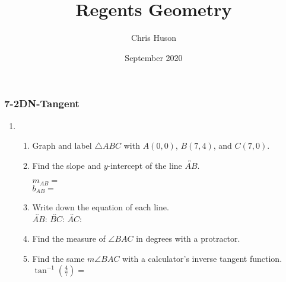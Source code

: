 \documentclass[12pt, twoside]{article}
\title{Regents Geometry}
\author{Chris Huson}
\date{September 2020}
\begin{document}
\subsubsection*{7-2DN-Tangent}
\begin{enumerate}
\item \begin{enumerate}
    \item Graph and label $\triangle ABC$ with $A(0,0)$, $B(7,4)$, and $C(7,0)$.
    \begin{center}
    \end{center}
    \item Find the slope and $y$-intercept of the line $\overleftrightarrow{AB}$.
      \begin{multicols}{2}
        $m_{AB}=$ \\
        $b_{AB}=$
      \end{multicols} \vspace{0.5cm}
    \item Write down the equation of each line. \\[0.5cm]
      $\overleftrightarrow{AB}$: \hfill
      $\overleftrightarrow{BC}$: \hfill
      $\overleftrightarrow{AC}$: \hspace{2cm}
    \vspace{2cm}
    \item Find the measure of $\angle BAC$ in degrees with a protractor. \vspace{0.5cm}
    \item Find the same $m\angle BAC$ with a calculator's inverse tangent function.\\[0.5cm]
    $\displaystyle \tan^{-1}(\frac{4}{7})=$
    \vspace{2cm}
  \end{enumerate}



\end{enumerate}
\end{document}
